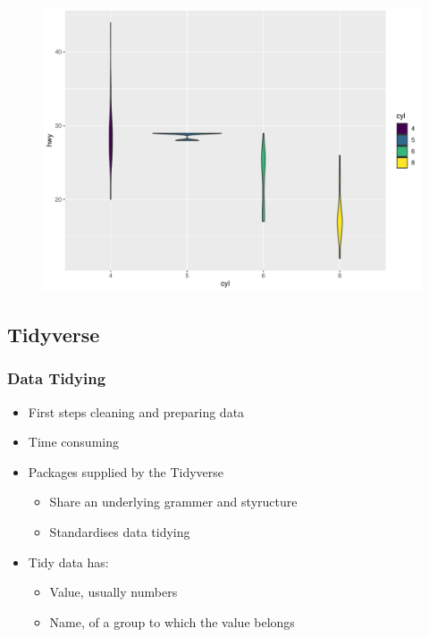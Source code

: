 \documentclass[
  letterpaper,
  DIV=11,
  numbers=noendperiod,
  landscape]{scrartcl}
\providecommand{\tightlist}{%
  \setlength{\itemsep}{0pt}\setlength{\parskip}{0pt}}\usepackage{longtable,booktabs,array}
\begin{document}
\begin{figure}[H]

{\centering \includegraphics{RandRStudio_files/figure-pdf/unnamed-chunk-19-1.pdf}

}

\end{figure}

\hypertarget{tidyverse}{%
\subsection{Tidyverse}\label{tidyverse}}

\hypertarget{data-tidying}{%
\subsubsection{Data Tidying}\label{data-tidying}}

\begin{itemize}
\tightlist
\item
  First steps cleaning and preparing data
\item
  Time consuming
\item
  Packages supplied by the Tidyverse

  \begin{itemize}
  \item
    Share an underlying grammer and styructure
  \item
    Standardises data tidying
  \end{itemize}
\item
  Tidy data has:

  \begin{itemize}
  \tightlist
  \item
    Value, usually numbers
  \item
    Name, of a group to which the value belongs
  \end{itemize}
\end{itemize}
\end{document}

